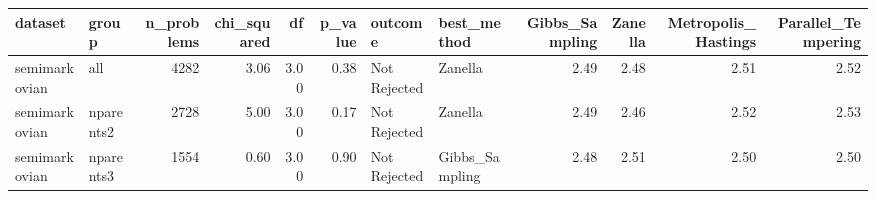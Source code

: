 \begin{table}[ht]
\centering
\begin{tabular}{llrrrrllrrrr}
  \hline
dataset & group & n\_problems & chi\_squared & df & p\_value & outcome & best\_method & Gibbs\_Sampling & Zanella & Metropolis\_Hastings & Parallel\_Tempering \\ 
  \hline
semimarkovian & all & 4282 & 3.06 & 3.00 & 0.38 & Not Rejected & Zanella & 2.49 & 2.48 & 2.51 & 2.52 \\ 
  semimarkovian & nparents2 & 2728 & 5.00 & 3.00 & 0.17 & Not Rejected & Zanella & 2.49 & 2.46 & 2.52 & 2.53 \\ 
  semimarkovian & nparents3 & 1554 & 0.60 & 3.00 & 0.90 & Not Rejected & Gibbs\_Sampling & 2.48 & 2.51 & 2.50 & 2.50 \\ 
   \hline
\end{tabular}
\end{table}

